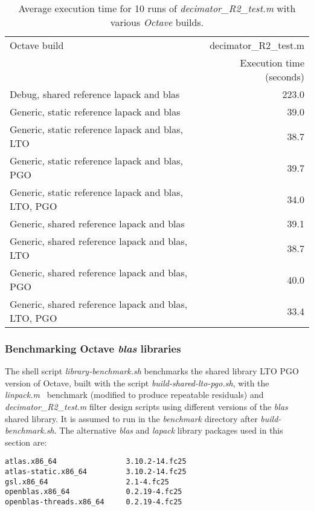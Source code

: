 \documentclass[a4paper,twoside,10pt,english]{report}
\begin{document}
\begin{table}[!htbp]
\centering
\begin{threeparttable}
\bgroup{}
\def\arraystretch{2}
\begin{tabular}{lr} \toprule
Octave build& decimator\_R2\_test.m \\
            & Execution time (seconds) \\
\midrule
Debug, shared reference lapack and blas              & 223.0 \\
Generic, static reference lapack and blas            &  39.0 \\
Generic, static reference lapack and blas, LTO       &  38.7 \\
Generic, static reference lapack and blas, PGO       &  39.7 \\
Generic, static reference lapack and blas, LTO, PGO  &  34.0 \\
Generic, shared reference lapack and blas            &  39.1 \\
Generic, shared reference lapack and blas, LTO       &  38.7 \\
Generic, shared reference lapack and blas, PGO       &  40.0 \\
Generic, shared reference lapack and blas, LTO, PGO  &  33.4 \\
\bottomrule
\end{tabular}
\egroup{}
\end{threeparttable}
\caption[Benchmark results for Octave builds]{Average execution time 
for 10 runs of \emph{decimator\_R2\_test.m} with various \emph{Octave} builds.}
\label{tab:benchmark-octave-builds}
\end{table}

\subsubsection*{Benchmarking Octave \emph{blas} libraries}
The shell script \emph{library-benchmark.sh} benchmarks the shared library 
LTO PGO version of Octave, built with the script \emph{build-shared-lto-pgo.sh},
with the \emph{linpack.m}~\cite{Rutter_LinpackBenchmark} benchmark (modified 
to produce repeatable residuals) and \emph{decimator\_R2\_test.m} filter design
scripts using different versions of the \emph{blas} shared library. It is 
assumed to run in the \emph{benchmark} directory after 
\emph{build-benchmark.sh}. The alternative \emph{blas} and \emph{lapack} 
library packages used in this section are:
\begin{small}
\begin{verbatim}
atlas.x86_64                3.10.2-14.fc25
atlas-static.x86_64         3.10.2-14.fc25
gsl.x86_64                  2.1-4.fc25
openblas.x86_64             0.2.19-4.fc25
openblas-threads.x86_64     0.2.19-4.fc25
\end{verbatim}
\end{small}
\end{document}
